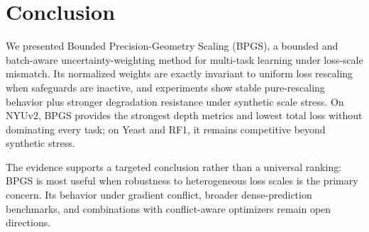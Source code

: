 \section{Conclusion}

We presented Bounded Precision-Geometry Scaling (BPGS), a bounded and batch-aware uncertainty-weighting method for multi-task learning under loss-scale mismatch. Its normalized weights are exactly invariant to uniform loss rescaling when safeguards are inactive, and experiments show stable pure-rescaling behavior plus stronger degradation resistance under synthetic scale stress. On NYUv2, BPGS provides the strongest depth metrics and lowest total loss without dominating every task; on Yeast and RF1, it remains competitive beyond synthetic stress.

The evidence supports a targeted conclusion rather than a universal ranking: BPGS is most useful when robustness to heterogeneous loss scales is the primary concern. Its behavior under gradient conflict, broader dense-prediction benchmarks, and combinations with conflict-aware optimizers remain open directions.

